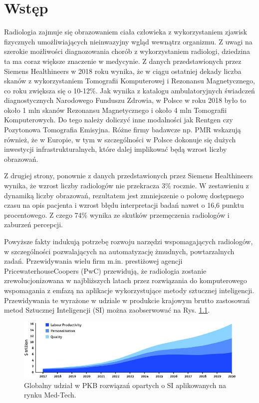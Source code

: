 \chapter{Wstęp}

Radiologia zajmuje się obrazowaniem ciała człowieka z wykorzystaniem zjawisk fizycznych umożliwiających nieinwazyjny wgląd wewnątrz organizmu. Z uwagi na szerokie możliwości diagnozowania chorób z wykorzystaniem radiologi, dziedzina ta ma coraz większe znaczenie w medycynie. Z danych przedstawionych przez Siemens Healthineers w 2018 roku wynika, że w ciągu ostatniej dekady liczba skanów z wykorzystaniem Tomografii Komputerowej i Rezonansu Magnetycznego, co roku zwiększa się o 10-12\%. Jak wynika z katalogu ambulatoryjnych świadczeń diagnostycznych Narodowego Funduszu Zdrowia, w Polsce w roku 2018 było to około 1 mln skanów Rezonansu Magnetycznego i około 4 mln Tomografii Komputerowych. Do tego należy doliczyć inne modalności jak Rentgen czy Pozytonowa Tomografia Emisyjna. Różne firmy badawcze np. PMR wskazują również, że w Europie, w tym w szczególności w Polsce dokonuje się dużych inwestycji infrastrukturalnych, które dalej implikować będą wzrost liczby obrazowań.
  
Z drugiej strony, ponownie z danych przedstawionych przez Siemens Healthineers wynika, że wzrost liczby radiologów nie przekracza 3\% rocznie. W zestawieniu z dynamiką liczby obrazowań, rezultatem jest zmniejszenie o połowę dostępnego czasu na opis pacjenta i wzrost błędu interpretacji badań nawet o 16,6 punktu procentowego. Z czego 74\% wynika ze skutków przemęczenia radiologów i zaburzeń percepcji.  


Powyższe fakty indukują potrzebę rozwoju narzędzi wspomagających radiologów, w szczególności pozwalających na automatyzację żmudnych, powtarzalnych zadań. Przewidywania wielu firm m.in. prestiżowej agencji PricewaterhouseCoopers (PwC) przewidują, że radiologia zostanie zrewolucjonizowana w najbliższych latach przez rozwiązania do komputerowego wspomagania z emfazą na aplikacje wykorzystujące metody sztucznej inteligencji. Przewidywania te wyrażone w udziale w produkcie krajowym brutto zastosowań metod Sztucznej Inteligencji (SI) można zaobserwować na Rys. \ref{MedTechGrowth}. 
\begin{figure}[h!]
	\centering
	\includegraphics[width=1.0\textwidth]{figures/AI_w_radiologii.jpeg}
	\caption{Globalny udział w PKB rozwiązań opartych o SI aplikowanych na rynku Med-Tech.}
	\label{MedTechGrowth}
\end{figure}

